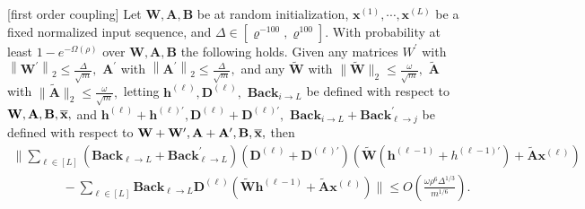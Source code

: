 \begin{lemma} \label{lemma:perturb_NTK_small} [first order coupling]
	Let $\mathbf{W}, \mathbf{A}, \mathbf{B}$ be at random initialization, $\mathbf{x}^{(1)}, \cdots, \mathbf{x}^{(L)}$ be a fixed normalized input sequence, and $\Delta \in\left[\varrho^{-100}, \varrho^{100}\right] .$ With probability at least $1-e^{-\Omega(\rho)}$ over $\mathbf{W}, \mathbf{A}, \mathbf{B}$ the following holds. Given any matrices $W^{\prime}$ with $\left\|\mathbf{W}^{\prime}\right\|_{2} \leq \frac{\Delta}{\sqrt{m}},$ $\mathbf{A}^{\prime}$ with $\left\|\mathbf{A}^{\prime}\right\|_{2} \leq \frac{\Delta}{\sqrt{m}},$ and any $\widetilde{\mathbf{W}}$ with $\|\widetilde{\mathbf{W}}\|_{2} \leq \frac{\omega}{\sqrt{m}},$ $\widetilde{\mathbf{A}}$ with $\|\widetilde{\mathbf{A}}\|_{2} \leq \frac{\omega}{\sqrt{m}},$ letting
	$\mathbf{h}^{(\ell)}, \mathbf{D}^{(\ell)},$  $\mathbf{Back}_{i \rightarrow L}$ be defined with respect to $\mathbf{W}, \mathbf{A}, \mathbf{B}, \overline{\mathbf{x}},$ and $\mathbf{h}^{(\ell)} + \mathbf{h}^{(\ell)\prime}, \mathbf{D}^{(\ell)} + \mathbf{D}^{(\ell)\prime},$  $\mathbf{Back}_{i \rightarrow L} + \mathbf{Back}^{\prime}_{\ell \rightarrow j}$ be defined with respect to $\mathbf{W}+\mathbf{W}^{\prime}, \mathbf{A} + \mathbf{A}',  \mathbf{B}, \overline{\mathbf{x}},$
	then
	$$
	\begin{array}{l}
		\| \sum_{\ell \in [L]}\left(\mathbf{Back}_{\ell \rightarrow L}+\mathbf{Back}_{\ell \rightarrow L}^{\prime}\right)\left(\mathbf{D}^{(\ell)}+\mathbf{D}^{(\ell)\prime}\right) \left(\widetilde{\mathbf{W}}\left(\mathbf{h}^{(\ell-1)}+h^{(\ell-1)\prime}\right) + \widetilde{\mathbf{A}} \mathbf{x}^{(\ell)} \right) \\
		\quad\quad\quad\quad -\sum_{\ell \in [L]} \mathbf{Back}_{\ell \rightarrow L}  \mathbf{D}^{(\ell)} \left(\widetilde{\mathbf{W}} \mathbf{h}^{(\ell-1)} + \widetilde{\mathbf{A}} \mathbf{x}^{(\ell)} \right) \| \leq O\left(\frac{\omega \rho^{6} \Delta^{1 / 3}}{m^{1 / 6}}\right).
	\end{array}
	$$
\end{lemma}

